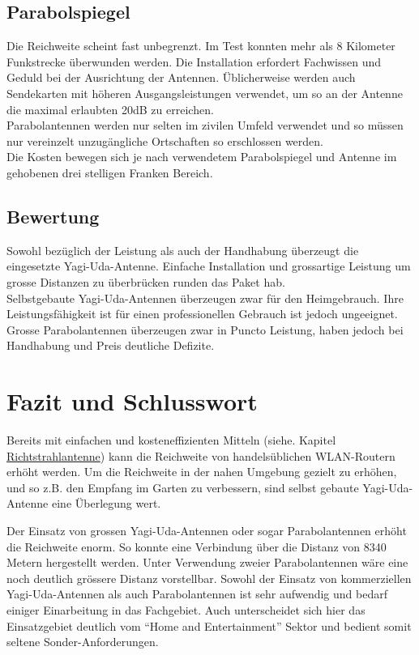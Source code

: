 \documentclass[oneside,11pt,parskip=half,ngerman]{scrreprt}
\begin{document}
\section{Parabolspiegel}\label{parabolspiegel-1}

Die Reichweite scheint fast unbegrenzt. Im Test konnten mehr als 8
Kilometer Funkstrecke überwunden werden. Die Installation erfordert
Fachwissen und Geduld bei der Ausrichtung der Antennen. Üblicherweise
werden auch Sendekarten mit höheren Ausgangsleistungen verwendet, um so
an der Antenne die maximal erlaubten 20dB zu erreichen.\\Parabolantennen
werden nur selten im zivilen Umfeld verwendet und so müssen nur
vereinzelt unzugängliche Ortschaften so erschlossen werden.\\Die Kosten
bewegen sich je nach verwendetem Parabolspiegel und Antenne im gehobenen
drei stelligen Franken Bereich.

\section{Bewertung}\label{bewertung}

Sowohl bezüglich der Leistung als auch der Handhabung überzeugt die
eingesetzte Yagi-Uda-Antenne. Einfache Installation und grossartige
Leistung um grosse Distanzen zu überbrücken runden das Paket
hab.\\Selbstgebaute Yagi-Uda-Antennen überzeugen zwar für den
Heimgebrauch. Ihre Leistungsfähigkeit ist für einen professionellen
Gebrauch ist jedoch ungeeignet.\\Grosse Parabolantennen überzeugen zwar
in Puncto Leistung, haben jedoch bei Handhabung und Preis deutliche
Defizite.

\chapter{Fazit und Schlusswort}\label{fazit-und-schlusswort}

Bereits mit einfachen und kosteneffizienten Mitteln (siehe. Kapitel
\hyperref[richtstrahlantenne]{Richtstrahlantenne}) kann die Reichweite
von handelsüblichen WLAN-Routern erhöht werden. Um die Reichweite in der
nahen Umgebung gezielt zu erhöhen, und so z.B. den Empfang im Garten zu
verbessern, sind selbst gebaute Yagi-Uda-Antenne eine Überlegung wert.

Der Einsatz von grossen Yagi-Uda-Antennen oder sogar Parabolantennen
erhöht die Reichweite enorm. So konnte eine Verbindung über die Distanz
von 8340 Metern hergestellt werden. Unter Verwendung zweier
Parabolantennen wäre eine noch deutlich grössere Distanz vorstellbar.
Sowohl der Einsatz von kommerziellen Yagi-Uda-Antennen als auch
Parabolantennen ist sehr aufwendig und bedarf einiger Einarbeitung in
das Fachgebiet. Auch unterscheidet sich hier das Einsatzgebiet deutlich
vom \enquote{Home and Entertainment} Sektor und bedient somit seltene
Sonder-Anforderungen.
\end{document}
